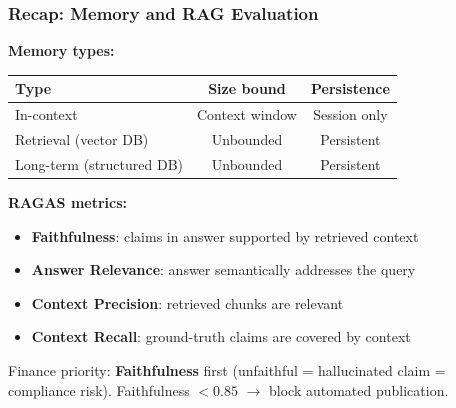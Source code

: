 \documentclass[9pt,t]{beamer}
\begin{document}
\begin{frame}
\frametitle{Recap: Memory and RAG Evaluation}

\textbf{Memory types:}
\begin{center}
\begin{tabular}{lcc}
\toprule
Type & Size bound & Persistence \\
\midrule
In-context & Context window & Session only \\
Retrieval (vector DB) & Unbounded & Persistent \\
Long-term (structured DB) & Unbounded & Persistent \\
\bottomrule
\end{tabular}
\end{center}

\medskip
\textbf{RAGAS metrics:}
\begin{itemize}
  \item \textbf{Faithfulness}: claims in answer supported by retrieved context
  \item \textbf{Answer Relevance}: answer semantically addresses the query
  \item \textbf{Context Precision}: retrieved chunks are relevant
  \item \textbf{Context Recall}: ground-truth claims are covered by context
\end{itemize}

Finance priority: \textbf{Faithfulness} first (unfaithful = hallucinated claim = compliance risk).
Faithfulness $< 0.85$ $\to$ block automated publication.
\end{frame}
\end{document}
